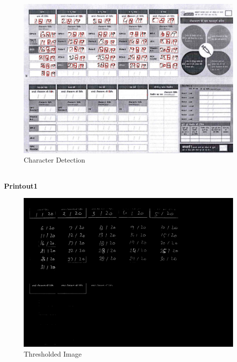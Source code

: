 \documentclass{article}
\begin{document}
    \begin{figure}[!htb]
    \minipage{\textwidth}
    \begin{center}
      \includegraphics[scale=.25]{4/.report/_char/s2.jpg}
      \caption{Character Detection}
    \end{center}
    \endminipage
    \end{figure}
\pagebreak \\
\textbf{Printout1}
    \begin{figure}[!htb]
    \minipage{\textwidth}
    \begin{center}
      \includegraphics[scale=.25]{4/.report/_thresh/p1.jpg}
      \caption{Thresholded Image}
    \end{center}
    \endminipage
    \end{figure}
\end{document}
